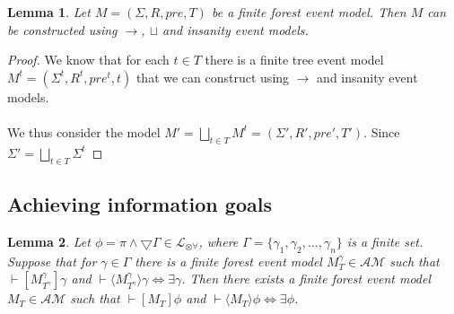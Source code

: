 \documentclass[12pt, a4paper, titlepage]{scrartcl}
\newtheorem{lemma}{Lemma}[section]
\numberwithin{equation}{section}
\newcommand{\cover}{\bigtriangledown}
\newcommand{\sqex}[1]{[{#1}]}
\newcommand{\anex}[1]{\langle {#1} \rangle}
\newcommand{\lang}{\mathcal{L}}
\newcommand{\langArbAct}{\lang_{\otimes\forall}}
\begin{document}
\begin{lemma} \label{forestCon}
Let $M = (\Sigma, R, pre, T)$ be a finite forest event model.
Then $M$ can be constructed using $\to$, $\sqcup$ and insanity event models.
\end{lemma}

\begin{proof}
We know that for each $t \in T$ there is a finite tree event model $M^t = (\Sigma^t, R^t, pre^t, t)$
that we can construct using $\to$ and insanity event models.\\
\\
We thus consider the model $M' = \bigsqcup_{t \in T} M^t = (\Sigma', R', pre', T')$.
Since $\Sigma' = \bigsqcup_{t \in T} \Sigma^t$
\end{proof}

\subsection{Achieving information goals}

\begin{lemma} \label{coverFormulaAchievementK}
Let $\phi = \pi \land \cover \Gamma \in \langArbAct$, where $\Gamma = \{\gamma_1, \gamma_2, \ldots,
		\gamma_n\}$ is a finite set.
Suppose that for $\gamma \in \Gamma$ there is a finite forest event model $M^\gamma_T \in \mathcal{AM}$ such that
$\vdash \sqex{M^\gamma_{T^\gamma}} \gamma$ and $\vdash \anex{ M^\gamma_{T^\gamma} } \gamma \iff \exists \gamma$.
Then there exists a finite forest event model $M_T \in \mathcal{AM}$ such that $\vdash \sqex{M_T}\phi$ and
$\vdash \anex{ M_T } \phi \iff \exists \phi$.
\end{lemma}
\end{document}
